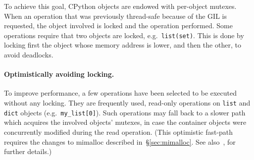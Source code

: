 To achieve this goal, CPython objects are endowed with per-object mutexes.
When an operation that was previously thread-safe because of the GIL is requested, the object involved is locked and the operation performed.
Some operations require that two objects are locked, e.g.\ \texttt{{list(set)}}.
This is done by locking first the object whose memory address is lower, and then the other, to avoid deadlocks.

\paragraph{Optimistically avoiding locking.}
To improve performance, a few operations have been selected to be executed without any locking.
They are frequently used, read-only operations on \texttt{list} and \texttt{dict} objects (e.g.\ \texttt{{my\_list[0]}}).
Such operations may fall back to a slower path which acquires the involved objects' mutexes, in case the container objects were concurrently modified during the read operation.
(This optimistic fast-path requires the changes to mimalloc described in~\S\ref{sec:mimalloc}.
See also~\cite[\S Optimistically Avoiding Locking]{pep703}, for further details.)
